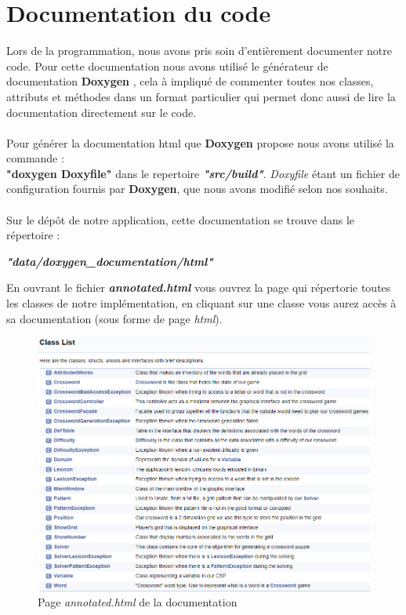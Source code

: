\documentclass [ 11 pt ] {article}
\begin{document}
\section{Documentation du code}
Lors de la programmation, nous avons pris soin d’entièrement documenter notre code. Pour cette documentation nous avons utilisé le générateur de documentation \textbf{Doxygen} \cite{Dox}, cela à impliqué de commenter toutes nos classes, attributs et méthodes dans un format particulier qui permet donc aussi de lire la documentation directement sur le code.
\\\\
Pour générer la documentation html que \textbf{Doxygen} propose nous avons utilisé la commande :\\
\textbf{"doxygen Doxyfile"} dans le repertoire \textbf{\textit{"src/build"}}. \textit{Doxyfile} étant un fichier de configuration fournis par \textbf{Doxygen}, que nous avons modifié selon nos souhaits.
\\\\
Sur le dépôt de notre application, cette documentation se trouve dans le répertoire : \begin{center}\center\textbf{\textit{"data/doxygen\_documentation/html"}}\end{center}
En ouvrant le fichier \textbf{\textit{annotated.html}} vous ouvrez la page qui répertorie toutes les classes de notre implémentation, en cliquant sur une classe vous aurez accès à sa documentation (sous forme de page \textit{html}).
\begin{figure}[H] 
    \center 
    \includegraphics[width=1\linewidth]{doxygen.png}
    \caption{Page \textit{annotated.html} de la documentation}
\end{figure}
\end{document}
